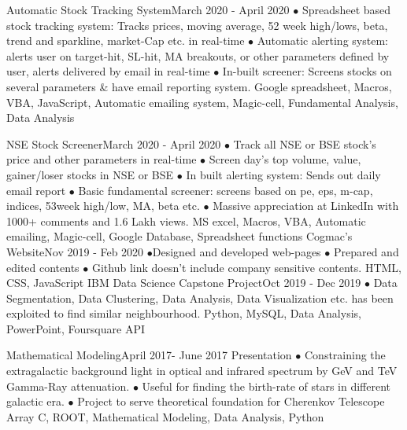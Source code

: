 \begin{projects}
    \project
    {Automatic Stock Tracking System}{March 2020 - April 2020}
    {}
    {$\bullet$ Spreadsheet based stock tracking system: Tracks prices, moving average, 52 week high/lows, beta, trend and sparkline, market-Cap etc. in real-time $\bullet$ Automatic alerting system: alerts user on target-hit, SL-hit, MA breakouts, or other parameters defined by user, alerts delivered by email in real-time $\bullet$ In-built screener: Screens stocks on several parameters \& have email reporting system.}
    {Google spreadsheet, Macros, VBA, JavaScript, Automatic emailing system, Magic-cell, Fundamental Analysis, Data Analysis}
    
     
    \project
    {NSE Stock Screener}{March 2020 - April 2020}
    {}
    {$\bullet$ Track all NSE or BSE stock's price and other parameters in real-time $\bullet$ Screen day's top volume, value, gainer/loser stocks in NSE or BSE $\bullet$ In built alerting system: Sends out daily email report $\bullet$ Basic fundamental screener: screens based on pe, eps, m-cap, indices, 53week high/low, MA, beta etc. $\bullet$ Massive appreciation at LinkedIn with 1000+ comments and 1.6 Lakh views.}
    {MS excel, Macros, VBA, Automatic emailing, Magic-cell, Google Database, Spreadsheet functions}
   \project   
    {Cogmac's Website}{Nov 2019 - Feb 2020}
    { }
    {$\bullet$Designed and developed web-pages $\bullet$ Prepared and edited contents $\bullet$ Github link doesn't include company sensitive contents.}
    {HTML, CSS, JavaScript}
    \project
    {IBM Data Science Capstone Project}{Oct 2019 - Dec 2019}
    {  }
    {$\bullet$ Data Segmentation, Data Clustering, Data Analysis, Data Visualization etc. has been exploited to find similar neighbourhood.}
    {Python, MySQL, Data Analysis, PowerPoint, Foursquare API}
    
   \project
    {Mathematical Modeling}{April 2017- June 2017}
    {  {Presentation} }
    {$\bullet$ Constraining the extragalactic background light in optical and infrared spectrum by GeV and TeV Gamma-Ray attenuation. $\bullet$ Useful for finding the birth-rate of stars in different galactic era. $\bullet$ Project to serve theoretical foundation for Cherenkov Telescope Array}
    {C, ROOT, Mathematical Modeling, Data Analysis, Python}
    

\end{projects}
